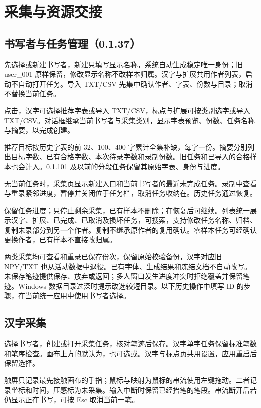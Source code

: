 \chapter{采集与资源交接}\label{ch:capture}
\section{书写者与任务管理（0.1.37）}
先选择或新建书写者，新建只填写显示名称，系统自动生成稳定唯一身份；旧 user\_001 原样保留，修改显示名称不改样本归属。汉字与扩展共用作者列表，启动不自动打开任务。导入 TXT/CSV 先集中确认作者、字表、份数与目录；取消不替换当前任务。

点击，汉字可选择推荐字表或导入 TXT/CSV，标点与扩展可按类别选字或导入 TXT/CSV。对话框继承当前书写者与采集类别，显示字表预览、份数、任务名称与摘要，以完成创建。

推荐目标按历史字表的前 32、100、400 字累计全集补缺，每字一份。摘要分别列出目标字数、已有合格字数、本次待录字数和录制份数。旧任务和已导入的合格样本也会计入。0.1.101 及以前的分段任务保留其原始字表、身份与进度。

无当前任务时，采集页显示新建入口和当前书写者的最近未完成任务。录制中查看与重录紧邻进度，暂停并关闭位于任务栏，取消任务收纳在。历史任务通过恢复。

保留任务进度；只停止剩余采集，已有样本不删除；在恢复后可继续。列表统一展示汉字、扩展、已完成、已取消及损坏任务，可搜索，支持修改任务名称、归档、复制未录部分到另一个作者。复制不继承原作者的复用确认。零样本任务可经确认更换作者，已有样本不直接改归属。

两类采集均可查看和重录已保存份次，保留原始校验备份，汉字对应旧 NPY/TXT 也从活动数据中退役。已有字体、生成结果和冻结文档不自动改写。未保存笔迹提供保存、放弃或返回；多人窗口发生进度冲突时拒绝覆盖并保留笔迹。Windows 数据目录过深时提示改选较短目录。以下历史操作中填写 ID 的步骤，在当前统一应用中使用书写者选择。

\section{汉字采集}
选择书写者，创建或打开采集任务，核对笔迹后保存。汉字单字任务保留标准笔数和笔序检查。画布上方的默认为，也可选或。汉字与标点页共用设置，应用重启后保留选择。

触屏只记录最先接触画布的手指；鼠标与映射为鼠标的串流使用左键拖动。二者记录坐标和时间，压感标为未采集。输入中断时保留已经抬笔的笔段。串流断开后若仍显示正在书写，可按 Esc 取消当前一笔。

